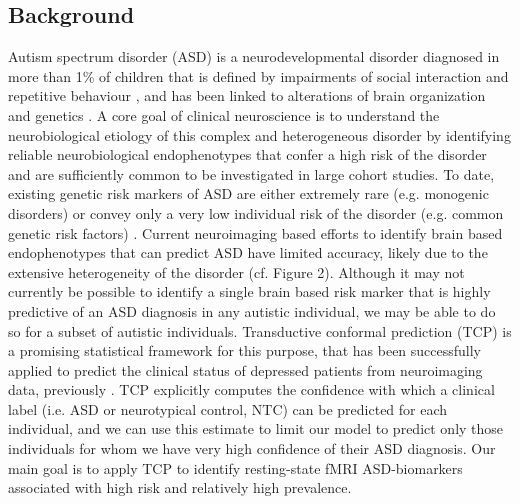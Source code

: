 \documentclass[9pt,lineno]{elife}
\begin{document}
\subsection{Background}
Autism spectrum disorder (ASD) is a neurodevelopmental disorder diagnosed in more than 1\% of children \citep{Bai2019-hb} that is defined by impairments of social interaction and repetitive behaviour \citep{American_Psychiatric_Association2013-ka}, and has been linked to alterations of brain organization \citep{Holiga2019-ub} and genetics \citep{Grove2019-vz}. A core goal of clinical neuroscience is to understand the neurobiological etiology of this complex and heterogeneous disorder \citep{Lombardo2019-mf} by identifying reliable neurobiological endophenotypes that confer a high risk of the disorder and are sufficiently common to be investigated in large cohort studies. To date, existing genetic risk markers of ASD are either extremely rare (e.g. monogenic disorders) or convey only a very low individual risk of the disorder (e.g. common genetic risk factors) \citep{Sanders2015-ef,De_la_Torre-Ubieta2016-fw}. Current neuroimaging based efforts to identify brain based endophenotypes that can predict ASD \citep{Abraham2017-vf,Heinsfeld2018-yl} have limited accuracy, likely due to the extensive heterogeneity of the disorder \citep{Lombardo2019-mf,Jacob2019-zf} (cf. Figure 2). Although it may not currently be possible to identify a single brain based risk marker that is highly predictive of an ASD diagnosis in any autistic individual, we may be able to do so for a subset of autistic individuals. Transductive conformal prediction (TCP) is a promising statistical framework \citep{Vapnik1998-vb,Vovk2005-uc} for this purpose, that has been successfully applied to predict the clinical status of depressed patients from neuroimaging data, previously \citep{Nouretdinov2011-ph}. TCP explicitly computes the confidence with which a clinical label (i.e. ASD or neurotypical control, NTC) can be predicted for each individual, and we can use this estimate to limit our model to predict only those individuals for whom we have very high confidence of their ASD diagnosis. Our main goal is to apply TCP to identify resting-state fMRI ASD-biomarkers associated with high risk and relatively high prevalence.
\end{document}
